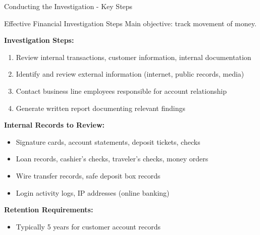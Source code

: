 \documentclass[11pt,a4paper]{beamer}
\begin{document}
	\begin{frame}{Conducting the Investigation - Key Steps}
		\begin{block}{Effective Financial Investigation Steps}
			Main objective: track movement of money.
		\end{block}
		\textbf{Investigation Steps:}
		\begin{enumerate}
			\item Review internal transactions, customer information, internal documentation
			\item Identify and review external information (internet, public records, media)
			\item Contact business line employees responsible for account relationship
			\item Generate written report documenting relevant findings
		\end{enumerate}
		\textbf{Internal Records to Review:}
		\begin{itemize}
			\item Signature cards, account statements, deposit tickets, checks
			\item Loan records, cashier's checks, traveler's checks, money orders
			\item Wire transfer records, safe deposit box records
			\item Login activity logs, IP addresses (online banking)
		\end{itemize}
		\textbf{Retention Requirements:}
		\begin{itemize}
			\item Typically 5 years for customer account records
		\end{itemize}
	\end{frame}
	
\end{document}
